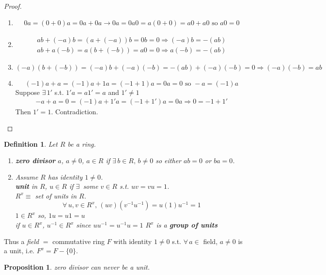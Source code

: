 \documentclass[10pt]{amsart}
\newtheorem{proposition}{Proposition}
\newtheorem{definition}{Definition}
\begin{document}
\begin{multicols*}{2}
\begin{proof}
\begin{enumerate}
	\item \[
	\begin{gathered}
	0a = (0 + 0) a = 0a + 0a \to 0a = 0 
	a0 = a(0 + 0) = a0 + a0 \text{ so } a0 = 0 	
	\end{gathered}
	\]
	\item 
	\[
	\begin{gathered} 
	ab + (-a)b = (a + (-a)) b = 0b = 0 \Longrightarrow (-a) b = -(ab) \\
	ab + a(-b) = a(b + (-b)) = a0 = 0 \Longrightarrow a(-b) = -(ab) 	
	\end{gathered} 
	\]
	\item \[
	(-a)(b + (-b)) = (-a)b + (-a)(-b) = -(ab) + (-a)(-b) = 0 \Longrightarrow (-a)(-b) =ab
	\]
	\item \[
	(-1)a  + a = (-1) a + 1a = (-1 + 1) a = 0a = 0 \text{ so } -a = (-1) a
	\]
	Suppose $\exists \, 1'$ s.t. $1' a = a1' = a$ and $1' \neq 1$  
	\[
	\begin{gathered}
	-a + a = 0 = (-1) a + 1' a = (-1 + 1') a = 0 a \Longrightarrow 0 = -1 + 1' 
	\end{gathered}
	\]
	Then $1' = 1$. Contradiction. 
\end{enumerate}
\end{proof}

\begin{definition}
Let $R$ be a ring.
\begin{enumerate}
	\item \textbf{zero divisor} $a$, $a\neq 0$, $a\in R$ if $\exists \,  b\in R, \, b\neq 0$ so either $ab= 0$ or $ba=0$. 
	\item Assume $R$ has identity $1\neq 0$. \\
	\textbf{unit} in $R$, $u\in R$ if $\exists \,$ some $v\in R$ s.t. $uv = vu =1$. \\
	$R^x \equiv $ set of units in $R$. 
	\[
	\forall \, u,v \in R^x, \, (uv) (v^{-1}u^{-1}) = u(1)u^{-1} = 1
	\]
	$1 \in R^x$ so, $1u = u1 = u$ \\
	if $u\in R^x$, $u^{-1} \in R^x$ since $uu^{-1} = u^{-1} u =1$ 
$R^x$ is a \textbf{group of units}
\end{enumerate}	
\end{definition} 

Thus a \emph{field} $= $ commutative ring $F$ with identity $1\neq 0$ s.t. $\forall \, a\in $ field, $a\neq 0$ is a unit, i.e. $F^x = F - \lbrace 0 \rbrace$. 

\begin{proposition}
	zero divisor can never be a unit. 
\end{proposition}


\end{multicols*}
\end{document}
